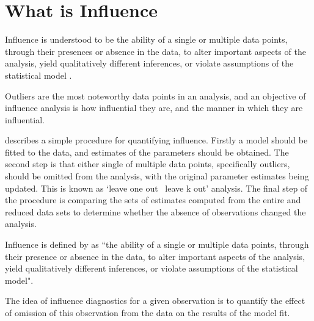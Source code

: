 \documentclass[12pt, a4paper]{report}
\theoremstyle{plain}
\theoremstyle{definition}
\theoremstyle{remark}
\begin{document}
%



\section{What is Influence} %
Influence is understood to be the ability of a single or multiple
data points, through their presences or absence in the data, to
alter important aspects of the analysis, yield qualitatively
different inferences, or violate assumptions of the statistical
model \citep{schabenberger}.

Outliers are the most noteworthy data points in an analysis, and
an objective of influence analysis is how influential they are,
and the manner in which they are influential.

\citet{schabenberger} describes a simple procedure for quantifying
influence. Firstly a model should be fitted to the data, and
estimates of the parameters should be obtained. The second step is
that either single of multiple data points, specifically outliers,
should be omitted from the analysis, with the original parameter
estimates being updated. This is known as `leave one out \ leave k
out' analysis. The final step of the procedure is comparing the
sets of estimates computed from the entire and reduced data sets
to determine whether the absence of observations changed the
analysis.

Influence is defined by \citet{schabenberger} as ``the ability of a single or multiple data points, through their presence
or absence in the data, to alter important aspects of the analysis, yield qualitatively different inferences, or
violate assumptions of the statistical model".

The idea of influence diagnostics for a given observation is to quantify the effect of omission of this observation 
from the data on the results of the model fit. %
\end{document}

